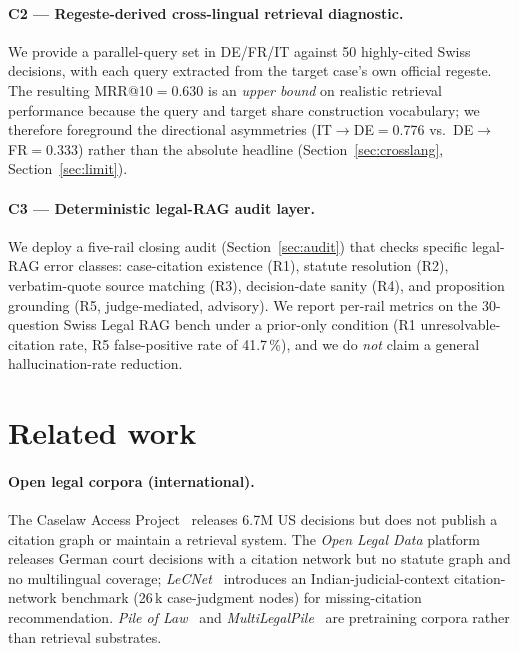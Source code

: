 \documentclass[11pt,a4paper]{article}
\begin{document}
\paragraph{C2 --- Regeste-derived cross-lingual retrieval diagnostic.} We provide a parallel-query set in DE/FR/IT against 50 highly-cited Swiss decisions, with each query extracted from the target case's own official regeste. The resulting MRR@10$=$0.630 is an \emph{upper bound} on realistic retrieval performance because the query and target share construction vocabulary; we therefore foreground the directional asymmetries (IT$\to$DE$=$0.776 vs.\ DE$\to$FR$=$0.333) rather than the absolute headline (Section~\ref{sec:crosslang}, Section~\ref{sec:limit}).

\paragraph{C3 --- Deterministic legal-RAG audit layer.} We deploy a five-rail closing audit (Section~\ref{sec:audit}) that checks specific legal-RAG error classes: case-citation existence (R1), statute resolution (R2), verbatim-quote source matching (R3), decision-date sanity (R4), and proposition grounding (R5, judge-mediated, advisory). We report per-rail metrics on the 30-question Swiss Legal RAG bench under a prior-only condition (R1 unresolvable-citation rate, R5 false-positive rate of 41.7\,\%), and we do \emph{not} claim a general hallucination-rate reduction.

\section{Related work}\label{sec:related}

\paragraph{Open legal corpora (international).} The Caselaw Access Project~\cite{cap2018} releases 6.7M US decisions but does not publish a citation graph or maintain a retrieval system. The \emph{Open Legal Data} platform~\cite{ostendorff2020} releases German court decisions with a citation network but no statute graph and no multilingual coverage; \emph{LeCNet}~\cite{lecnet2025} introduces an Indian-judicial-context citation-network benchmark (26\,k case-judgment nodes) for missing-citation recommendation. \emph{Pile of Law}~\cite{pile2022} and \emph{MultiLegalPile}~\cite{niklaus2023} are pretraining corpora rather than retrieval substrates.
\end{document}
